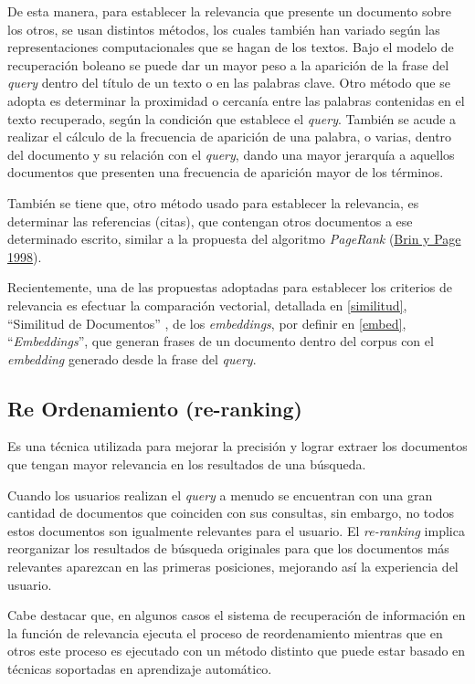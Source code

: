 \documentclass[
  12pt,
  openany]{book}
\begin{document}
De esta manera, para establecer la relevancia que presente un documento sobre los otros, se usan distintos métodos, los cuales también han variado según las representaciones computacionales que se hagan de los textos. Bajo el modelo de recuperación boleano se puede dar un mayor peso a la aparición de la frase del \emph{query} dentro del título de un texto o en las palabras clave. Otro método que se adopta es determinar la proximidad o cercanía entre las palabras contenidas en el texto recuperado, según la condición que establece el \emph{query}. También se acude a realizar el cálculo de la frecuencia de aparición de una palabra, o varias, dentro del documento y su relación con el \emph{query}, dando una mayor jerarquía a aquellos documentos que presenten una frecuencia de aparición mayor de los términos.

También se tiene que, otro método usado para establecer la relevancia, es determinar las referencias (citas), que contengan otros documentos a ese determinado escrito, similar a la propuesta del algoritmo \emph{PageRank} (\protect\hyperlink{ref-brin1998}{Brin y Page 1998}).

Recientemente, una de las propuestas adoptadas para establecer los criterios de relevancia es efectuar la comparación vectorial, detallada en \ref{similitud}, ``Similitud de Documentos'' , de los \emph{embeddings}, por definir en \ref{embed}, ``\emph{Embeddings}'', que generan frases de un documento dentro del corpus con el \emph{embedding} generado desde la frase del \emph{query}.

\hypertarget{ranking}{%
\subsection{Re Ordenamiento (re-ranking)}\label{ranking}}

Es una técnica utilizada para mejorar la precisión y lograr extraer los documentos que tengan mayor relevancia en los resultados de una búsqueda.

Cuando los usuarios realizan el \emph{query} a menudo se encuentran con una gran cantidad de documentos que coinciden con sus consultas, sin embargo, no todos estos documentos son igualmente relevantes para el usuario. El \emph{re-ranking} implica reorganizar los resultados de búsqueda originales para que los documentos más relevantes aparezcan en las primeras posiciones, mejorando así la experiencia del usuario.

Cabe destacar que, en algunos casos el sistema de recuperación de información en la función de relevancia ejecuta el proceso de reordenamiento mientras que en otros este proceso es ejecutado con un método distinto que puede estar basado en técnicas soportadas en aprendizaje automático.
\end{document}
